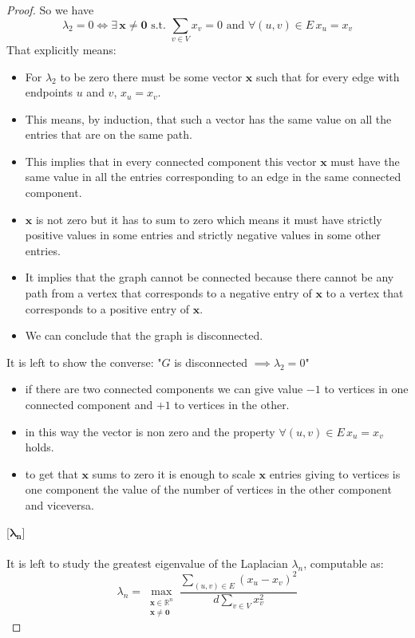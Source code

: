 \begin{theorem}
\begin{proof}
So we have 
\[\lambda_2 = 0 \iff \exists \, \mathbf{x} \ne \mathbf{0} \text{ s.t. } \sum_{v \in V} x_v = 0 \text{ and } \forall (u,v) \in E \, x_u = x_v \] 
That explicitly means:
\begin{itemize}
\item For $ \lambda_2 $ to be zero there must be some vector $ \mathbf{x} $ such that for every edge  with endpoints $ u $ and $ v $, $ x_u = x_v $. \\
\item This means, by induction, that such a vector has the same value on all the entries that are on the same path. \\
\item This implies that in every connected component this vector $ \mathbf{x} $ must have the same value in all the entries corresponding to an edge in the same connected component. \\
\item $ \mathbf{x} $ is not zero but it has to sum to zero which means it must have strictly positive values in some entries and strictly negative values in some other entries. \\
\item It implies that the graph cannot be connected because there cannot be any path from a vertex that corresponds to a negative entry of $ \mathbf{x} $ to a vertex that corresponds to a positive entry of $ \mathbf{x} $.\\
\item We can conclude that the graph is disconnected.
\end{itemize}
It is left to show the converse: "$ G $ is disconnected $ \implies \lambda_2 = 0 $" \\
\begin{itemize}
\item if there are two connected components we can give value $ -1 $ to vertices in one connected component and $ +1 $ to vertices in the other. \\
\item in this way the vector is non zero and the property $ \forall (u,v) \in E \, x_u = x_v  $ holds. \\
\item to get that $ \mathbf{x} $ sums to zero it is enough to scale $ \mathbf{x} $ entries giving to vertices is one component the value of the number of vertices in the other component and viceversa.
\end{itemize}

[$ \mathbf{\lambda_n} $]
\\
\\
It is left to study the greatest eigenvalue of the Laplacian $ \lambda_n $, computable as:
\[\lambda_n = \max_{\substack{\mathbf{x} \in \mathbb{R}^n \\ \mathbf{x} \ne \mathbf{0}}} \frac{\sum_{(u,v)\in E}(x_u-x_v)^2}{d \sum_{v \in V} x_v^2 } \]


\end{proof}
\end{theorem}
